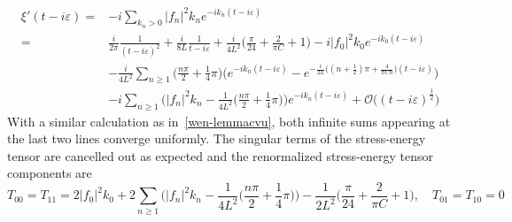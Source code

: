 \begin{equation*}
\begin{split}
\xi'(t  - i\varepsilon)  = & -i\sum_{k_n>0}|f_n|^2k_n e^{-ik_n(t-i\varepsilon)} \\
%
%
= & \frac{i}{2\pi}\frac{1}{(t-i\varepsilon)^2}  + 
\frac{i}{8L}\frac{1}{t-i\varepsilon}
+\frac{i}{4L^2}\big(\frac{\pi}{24} + \frac{2}{\pi C} +1 \big)
- i |f_0|^2k_0e^{-ik_0(t-i\varepsilon)}
\\
% 
& -\frac{i}{4L^2}\sum_{n\geq1}\Big(\frac{n\pi}{2} + \frac 1 4 \pi\Big)
\bigg(e^{-ik_n(t-i\varepsilon)}
-e^{-\frac{i}{2L}\big((n+\frac 1 2 )\pi + \frac{4}{\pi C n} \big)(t-i\varepsilon)} \bigg) \\
&-i \sum_{n \geq 1} \Big( |f_n|^2 k_n - \frac{1}{4L^2}\big(\frac{n\pi}{2} + \frac 1 4 \pi \big) \Big) e^{-ik_n(t-i\varepsilon)}
+\mathcal{O}\big((t-i\varepsilon)^{\frac{1}{2}}\big)
\end{split}
\end{equation*}
With a similar calculation as in~\cref{wen-lemmacvu}, both infinite sums appearing at the last two lines converge uniformly.
The singular terms of the stress-energy tensor are cancelled out as expected and the renormalized stress-energy tensor components are
\begin{equation*}
T_{00} = T_{11}= 2 |f_0|^2 k_0 + 2 \sum_{n\geq1} \Big( |f_n|^2 k_n - 
\frac{1}{4L^2}\big(\frac{n\pi}{2} + \frac 1 4 \pi \big) \Big)
-\frac{1}{2L^2}\big(\frac{\pi}{24} + \frac{2}{\pi C}+1\big)
 , \quad
T_{01}=T_{10}  = 0
\end{equation*}










